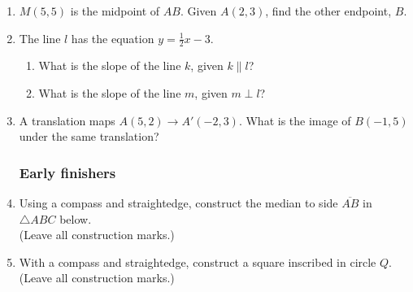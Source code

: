\documentclass[12pt, twoside]{article}
\begin{document}
\begin{enumerate}
  \item $M(5,5)$ is the midpoint of $AB$. Given $A(2,3)$, find the other endpoint, $B$. \vspace{2cm}

  \item The line $l$ has the equation $y=\frac{1}{2} x-3$.
    \begin{enumerate}
      \item What is the slope of the line $k$, given $k \parallel l$?
      \vspace{1cm}
      \item What is the slope of the line $m$, given $m \perp l$?
      \vspace{1cm}
    \end{enumerate}

    \item A translation maps $A(5,2) \rightarrow A'(-2,3)$. What is the image of $B(-1,5)$ under the same translation?  \vspace{0.5cm}


\newpage
\subsubsection*{Early finishers}

\item Using  a  compass  and  straightedge,  construct  the  median  to  side $\overline{AB}$ in $\triangle ABC$ below.\\ (Leave all construction marks.)
  \vspace{1cm}
\begin{center}
\end{center}

  \vspace{2cm}

\item With a compass and straightedge, construct a square inscribed in circle $Q$. (Leave all construction marks.)
  \vspace{1cm}
  \begin{center}
  \end{center}

\end{enumerate}
\end{document}
